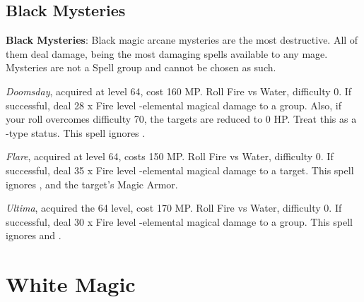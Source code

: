 \begin{multicols}{2}
    \subsection{Black Mysteries}\label{subsec:black-mysteries}

    \textbf{Black Mysteries}: Black magic arcane mysteries are the most destructive. All of them deal damage, being the most damaging spells available to any mage. Mysteries are not a Spell group and cannot be chosen as such.
    
    \textit{Doomsday}, acquired at level 64, cost 160 MP\@. Roll Fire vs Water, difficulty 0. If successful, deal 28 x Fire level -elemental magical damage to a group. Also, if your roll overcomes difficulty 70, the targets are reduced to 0 HP\@. Treat this as a -type status.  This spell ignores .
    
    \textit{Flare}, acquired at level 64, costs 150 MP\@. Roll Fire vs Water, difficulty 0. If successful, deal 35 x Fire level -elemental magical damage to a target. This spell ignores ,  and the target’s Magic Armor.  
    
    \textit{Ultima}, acquired the 64 level, cost 170 MP\@. Roll Fire vs Water, difficulty 0. If successful, deal 30 x Fire level -elemental magical damage to a group. This spell ignores  and . 

\end{multicols}

\section{White Magic}\label{sec:magic-white}

